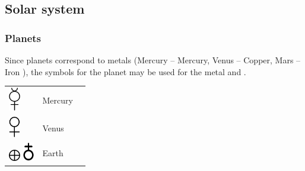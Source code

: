 \documentclass[british,final,landscape]{scrartcl}
\begin{document}
\begin{refsection}
\subsection{Solar system}

\subsubsection{Planets}

Since planets correspond to metals (Mercury -- Mercury, Venus -- Copper, Mars -- Iron ), the symbols for the planet may be used for the metal and .


 \tablelasttail{\bottomrule} \label{tab:solar}
 \begin{supertabular}{p{0.3\textwidth}p{0.34\textwidth}p{0.34\textwidth}}
  \includegraphics[width=5mm]{Astrology/Mercury} & Mercury & \\
  \includegraphics[width=5mm]{Astrology/Venus}   & Venus   & \\
  \includegraphics[width=5mm]{Astrology/Earth} \includegraphics[width=5mm]{Astrology/Earth2}  & Earth   & \\

\end{supertabular}
\end{refsection}
\end{document}

